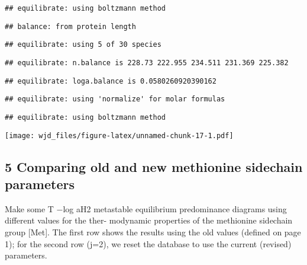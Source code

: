 \documentclass[]{article}
\begin{document}
\begin{verbatim}
## equilibrate: using boltzmann method
\end{verbatim}

\begin{verbatim}
## balance: from protein length
\end{verbatim}

\begin{verbatim}
## equilibrate: using 5 of 30 species
\end{verbatim}

\begin{verbatim}
## equilibrate: n.balance is 228.73 222.955 234.511 231.369 225.382
\end{verbatim}

\begin{verbatim}
## equilibrate: loga.balance is 0.0580260920390162
\end{verbatim}

\begin{verbatim}
## equilibrate: using 'normalize' for molar formulas
\end{verbatim}

\begin{verbatim}
## equilibrate: using boltzmann method
\end{verbatim}

\texttt{[image: wjd\_files/figure-latex/unnamed-chunk-17-1.pdf]}

\subsection{5 Comparing old and new methionine sidechain
parameters}\label{comparing-old-and-new-methionine-sidechain-parameters}

Make some T −log aH2 metastable equilibrium predominance diagrams using
different values for the ther- modynamic properties of the methionine
sidechain group {[}Met{]}. The ﬁrst row shows the results using the old
values (deﬁned on page 1); for the second row (j=2), we reset the
database to use the current (revised) parameters.
\end{document}
